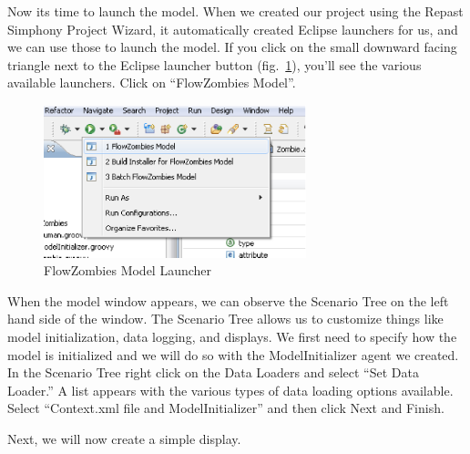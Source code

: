 \documentclass[11pt]{amsart}
\begin{document}
Now its time to launch the model. When we created our project using the Repast Simphony Project Wizard, it automatically created Eclipse launchers for us, and we can use those to launch the model. If you click on the small downward facing triangle next to the Eclipse launcher button (fig.~\ref{fig:launch}), you'll see the various available launchers. Click on ``FlowZombies Model''.

\begin{figure}[h]
\begin{center}
\vspace{.2in}
\centerline {
\includegraphics[width=3in]{figs/launcher.eps}
}
\caption{FlowZombies Model Launcher}
\label{fig:launch}
\end{center}
\end{figure}

When the model window appears, we can observe the Scenario Tree on the left hand side of the window.  The Scenario Tree allows us to customize things like model initialization, data logging, and displays.  We first need to specify how the model is initialized and we will do so with the ModelInitializer agent we created.  In the Scenario Tree right click on the Data Loaders and select ``Set Data Loader.''  A list appears with the various types of data loading options available.  Select ``Context.xml file and ModelInitializer'' and then click Next and Finish.

Next, we will now create a simple display. 
\end{document}
